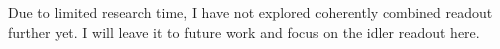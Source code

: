 Due to limited research time, I have not explored coherently combined readout further yet. I will leave it to future work and focus on the idler readout here. 

\label{sec:nIS_general_behaviour_idler}

